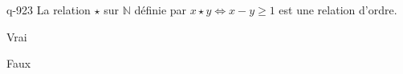 \begin{truefalse}{q-923}
La relation $\star$ sur $\mathbb N$ définie par $x\star y \iff x-y\geq 1$ est une relation d'ordre.
\item Vrai
\item* Faux
\end{truefalse}

